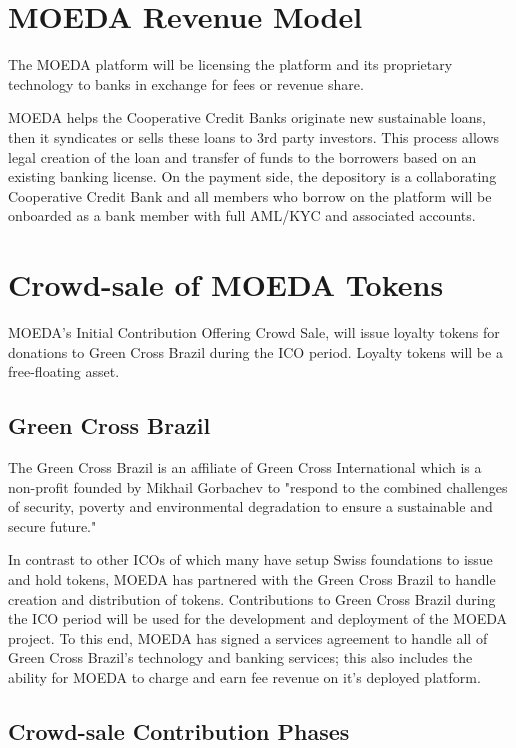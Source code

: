 \documentclass{article}
\begin{document}
\section {MOEDA Revenue Model}

The MOEDA platform will be licensing the platform and its proprietary technology to banks in exchange for fees or revenue share. 

MOEDA helps the Cooperative Credit Banks originate new sustainable loans, then it syndicates or sells these loans to 3rd party investors. This process allows legal creation of the loan and transfer of funds to the borrowers based on an existing banking license. On the payment side, the depository is a collaborating Cooperative Credit Bank and all members who borrow on the platform will be onboarded as a bank member with full AML/KYC and associated accounts.

\section{ Crowd-sale of MOEDA Tokens }

MOEDA’s Initial Contribution Offering Crowd Sale, will issue loyalty tokens for donations to Green Cross Brazil during the ICO period. Loyalty tokens will be a free-floating asset.

\subsection{Green Cross Brazil}

The Green Cross Brazil is an affiliate of Green Cross International which is a non-profit founded by Mikhail Gorbachev to "respond to the combined challenges of security, poverty and environmental degradation to ensure a sustainable and secure future."

In contrast to other ICOs of which many have setup Swiss foundations to issue and hold tokens, MOEDA has partnered with the Green Cross Brazil to handle creation and distribution of tokens. Contributions to Green Cross Brazil during the ICO period will be used for the development and deployment of the MOEDA project. To this end, MOEDA has signed a services agreement to handle all of Green Cross Brazil's technology and banking services; this also includes the ability for MOEDA to charge and earn fee revenue on it's deployed platform.

\subsection {Crowd-sale Contribution Phases}
\end{document}
